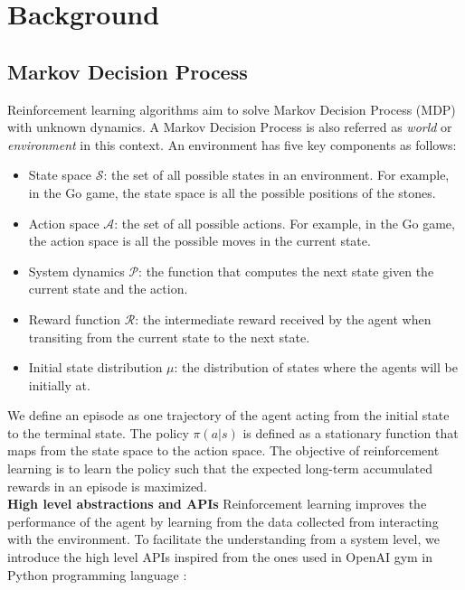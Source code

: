 \section{Background}
\subsection{Markov Decision Process}\label{sec:mdp}
Reinforcement learning algorithms aim to solve Markov Decision Process (MDP) with unknown dynamics. A Markov Decision Process \cite{rl_intro} is also referred as \textit{world} or \textit{environment} in this context. An environment has five key components as follows:
\begin{itemize}
    \item State space $\mathcal{S}$: the set of all possible states in an environment. For example, in the Go game, the state space is all the possible positions of the stones.
    \item Action space $\mathcal{A}$: the set of all possible actions. For example, in the Go game, the action space is all the possible moves in the current state.
    \item System dynamics $\mathcal{P}$: the function that computes the next state given the current state and the action. 
    \item Reward function $\mathcal{R}$: the intermediate reward received by the agent when transiting from the current state to the next state.
    \item Initial state distribution $\mu$: the distribution of states where the agents will be initially at.
\end{itemize}
We define an episode as one trajectory of the agent acting from the initial state to the terminal state.
The policy $\pi(a|s)$ is defined as a stationary function that maps from the state space to the action space. The objective of reinforcement learning is to learn the policy such that the expected long-term accumulated rewards in an episode is maximized. 
\\\textbf{High level abstractions and APIs}
Reinforcement learning improves the performance of the agent by learning from the data collected from interacting with the environment. To facilitate the understanding from a system level, we introduce the high level APIs inspired from the ones used in OpenAI gym \cite{openai_gym} in Python programming language \cite{python}:
